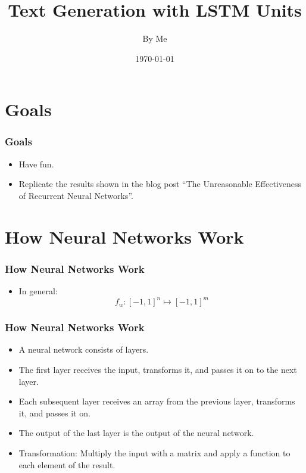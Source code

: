 \documentclass[12]{beamer}
\title{Text Generation with LSTM Units}
\author{By Me}
\date{\today}
\begin{document}
\begin{frame}
\titlepage
\end{frame}

\section{Goals}
\begin{frame}
\frametitle{Goals}
\begin{itemize}
\item<1-> Have fun.
\item<1-> Replicate the results shown in the blog post ``The Unreasonable Effectiveness of Recurrent Neural Networks''.
\end{itemize}
\end{frame}


\section{How Neural Networks Work}
\begin{frame}
\frametitle{How Neural Networks Work}
\begin{itemize}
\item<1-> In general:
$$f_w:\left[-1,1\right]^n\longmapsto\left[-1,1\right]^m$$
\end{itemize}
\end{frame}

\begin{frame}
\frametitle{How Neural Networks Work}
\begin{itemize}
\item<1-> A neural network consists of layers.
\item<1-> The first layer receives the input, transforms it, and passes it on to the next layer.
\item<1-> Each subsequent layer receives an array from the previous layer, transforms it, and passes it on.
\item<1-> The output of the last layer is the output of the neural network.
\item<2-> Transformation: Multiply the input with a matrix and apply a function to each element of the result.
\end{itemize}
\end{frame}
\end{document}
